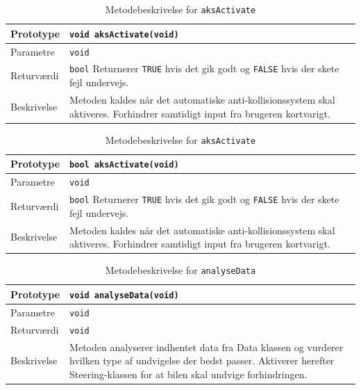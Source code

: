 \begin{table}[h]
\begin{tabularx}{\textwidth}{| L{2.5 cm} | Z |} \hline
Prototype & \texttt{void aksActivate(void)} \\\hline
Parametre & \texttt{void}  \\\hline
Returværdi &  \texttt{bool} \newline Returnerer \texttt{TRUE} hvis det gik godt og \texttt{FALSE} hvis der skete fejl undervejs. \\\hline
Beskrivelse & Metoden kaldes når det automatiske anti-kollisionssystem skal aktiveres. Forhindrer samtidigt input fra brugeren kortvarigt. \\\hline
\end{tabularx}
\caption{Metodebeskrivelse for \texttt{aksActivate}}
\label{table:met_aks_aksActivate}
\end{table}

\begin{table}[h]
\begin{tabularx}{\textwidth}{| L{2.5 cm} | Z |} \hline
Prototype & \texttt{bool aksActivate(void)} \\\hline
Parametre & \texttt{void}  \\\hline
Returværdi &  \texttt{bool} \newline Returnerer \texttt{TRUE} hvis det gik godt og \texttt{FALSE} hvis der skete fejl undervejs. \\\hline
Beskrivelse & Metoden kaldes når det automatiske anti-kollisionssystem skal aktiveres. Forhindrer samtidigt input fra brugeren kortvarigt. \\\hline
\end{tabularx}
\caption{Metodebeskrivelse for \texttt{aksActivate}}
\label{table:met_aks_aksActivate}
\end{table}

\begin{table}[h]
\begin{tabularx}{\textwidth}{| L{2.5 cm} | Z |} \hline
Prototype & \texttt{void analyseData(void)} \\\hline
Parametre & \texttt{void}  \\\hline
Returværdi &  \texttt{void}  \\\hline
Beskrivelse & Metoden analyserer indhentet data fra Data klassen og vurderer hvilken type af undvigelse der bedst passer. Aktiverer herefter Steering-klassen for at bilen skal undvige forhindringen. \\\hline
\end{tabularx}
\caption{Metodebeskrivelse for \texttt{analyseData}}
\label{table:met_aks_analyseData}
\end{table}